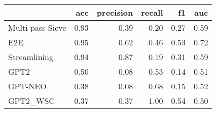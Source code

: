 \begin{tabular}{lrrrrr}
\toprule
{} &  acc &  precision &  recall &   f1 &  auc \\
\midrule
Multi-pass Sieve & 0.93 &       0.39 &    0.20 & 0.27 & 0.59 \\
E2E              & 0.95 &       0.62 &    0.46 & 0.53 & 0.72 \\
Streamlining     & 0.94 &       0.87 &    0.19 & 0.31 & 0.59 \\
GPT2             & 0.50 &       0.08 &    0.53 & 0.14 & 0.51 \\
GPT-NEO          & 0.38 &       0.08 &    0.68 & 0.15 & 0.52 \\
GPT2\_WSC         & 0.37 &       0.37 &    1.00 & 0.54 & 0.50 \\
\bottomrule
\end{tabular}
